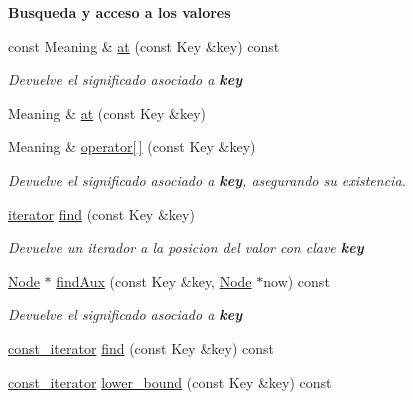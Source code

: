 \begin{Indent}{\bf Busqueda y acceso a los valores}\par
\begin{DoxyCompactItemize}
\item 
const Meaning \& \hyperlink{classaed2_1_1map_a0b0a11f906da2926f9eb342fcee79fd7_a0b0a11f906da2926f9eb342fcee79fd7}{at} (const Key \&key) const 
\begin{DoxyCompactList}\small\item\em Devuelve el significado asociado a {\bfseries key} \end{DoxyCompactList}\item 
Meaning \& \hyperlink{classaed2_1_1map_a6b21c09f59a83b6ee45432dcfa61f4a1_a6b21c09f59a83b6ee45432dcfa61f4a1}{at} (const Key \&key)
\item 
Meaning \& \hyperlink{classaed2_1_1map_a96f23896164ab47bee48c26b803f9801_a96f23896164ab47bee48c26b803f9801}{operator\mbox{[}$\,$\mbox{]}} (const Key \&key)
\begin{DoxyCompactList}\small\item\em Devuelve el significado asociado a {\bfseries key}, asegurando su existencia. \end{DoxyCompactList}\item 
\hyperlink{classaed2_1_1map_1_1iterator}{iterator} \hyperlink{classaed2_1_1map_afd0fc1a8234888e61e0e615de7e245b8_afd0fc1a8234888e61e0e615de7e245b8}{find} (const Key \&key)
\begin{DoxyCompactList}\small\item\em Devuelve un iterador a la posicion del valor con clave {\bfseries key} \end{DoxyCompactList}\item 
\hyperlink{structaed2_1_1map_1_1Node}{Node} $\ast$ \hyperlink{classaed2_1_1map_aceb6b18a1a35f3c9bab1d1c378f3d14b_aceb6b18a1a35f3c9bab1d1c378f3d14b}{find\+Aux} (const Key \&key, \hyperlink{structaed2_1_1map_1_1Node}{Node} $\ast$now) const 
\begin{DoxyCompactList}\small\item\em Devuelve el significado asociado a {\bfseries key} \end{DoxyCompactList}\item 
\hyperlink{classaed2_1_1map_1_1const__iterator}{const\+\_\+iterator} \hyperlink{classaed2_1_1map_ab8f3e41b1a0d7b74645836f8d2e1acfc_ab8f3e41b1a0d7b74645836f8d2e1acfc}{find} (const Key \&key) const 
\item 
\hyperlink{classaed2_1_1map_1_1const__iterator}{const\+\_\+iterator} \hyperlink{classaed2_1_1map_a3399d36fdd5a880b494f3a5795d3f18f_a3399d36fdd5a880b494f3a5795d3f18f}{lower\+\_\+bound} (const Key \&key) const 

\end{DoxyCompactItemize}
\end{Indent}
